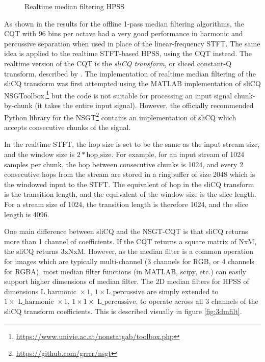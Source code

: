 \documentclass[letter,12pt]{article}
\begin{document}
\begin{appendices}
\begin{figure}[ht]
	\caption{Realtime median filtering HPSS}
	\label{fig:rthpss}
\end{figure}

As shown in the results for the offline 1-pass median filtering algorithms, the CQT with 96 bins per octave had a very good performance in harmonic and percussive separation when used in place of the linear-frequency STFT. The same idea is applied to the realtime STFT-based HPSS, using the CQT instead. The realtime version of the CQT is the \textit{sliCQ transform}, or sliced constant-Q transform, described by \citet{rtcqt}. The implementation of realtime median filtering of the sliCQ transform was first attempted using the MATLAB implementation of sliCQ NSGToolbox,\footnote{\url{https://www.univie.ac.at/nonstatgab/toolbox.php}} but the code is not suitable for processing an input signal chunk-by-chunk (it takes the entire input signal). However, the officially recommended Python library for the NSGT\footnote{\url{https://github.com/grrrr/nsgt}} contains an implementation of sliCQ which accepts consecutive chunks of the signal.

In the realtime STFT, the hop size is set to be the same as the input stream size, and the window size is $2*\text{hop\_size}$. For example, for an input stream of 1024 samples per chunk, the hop between consecutive chunks is 1024, and every 2 consecutive hops from the stream are stored in a ringbuffer of size 2048 which is the windowed input to the STFT. The equivalent of hop in the sliCQ transform is the transition length, and the equivalent of the window size is the slice length. For a stream size of 1024, the transition length is therefore 1024, and the slice length is 4096.

One main difference between sliCQ and the NSGT-CQT is that sliCQ returns more than 1 channel of coefficients. If the CQT returns a square matrix of NxM, the sliCQ returns 3xNxM. However, as the median filter is a common operation for images which are typically multi-channel (3 channels for RGB, or 4 channels for RGBA), most median filter functions (in MATLAB, scipy, etc.) can easily support higher dimensions of median filter. The 2D median filters for HPSS of dimensions $\text{L\_harmonic } \times 1$, $1 \times \text{L\_percussive}$ are simply extended to $1 \times \text{ L\_harmonic } \times 1$, $1 \times 1 \times \text{ L\_percussive}$, to operate across all 3 channels of the sliCQ transform coefficients. This is described visually in figure \ref{fig:3dmfilt}.


\end{appendices}
\end{document}
